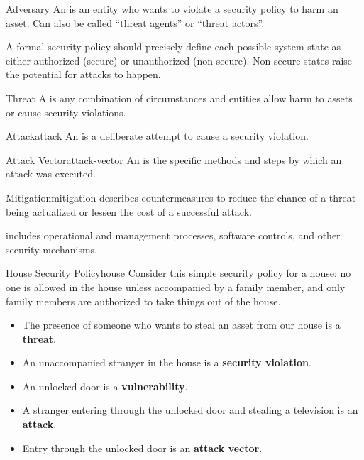 \documentclass[12pt]{report}
\begin{document}
\begin{dfnbox}{Adversary}{}
    An  is an entity who wants to violate a security policy to harm an asset.
    \tcblower
    Can also be called ``threat agents'' or ``threat actors''.
\end{dfnbox}

A formal security policy should precisely define each possible system state as either authorized (secure) or unauthorized (non-secure). Non-secure states raise the potential for attacks to happen.

\begin{dfnbox}{Threat}{}
    A  is any combination of circumstances and entities allow harm to assets or cause security violations.
\end{dfnbox}

\begin{dfnbox}{Attack}{attack}
    An  is a deliberate attempt to cause a security violation.
\end{dfnbox}

\begin{dfnbox}{Attack Vector}{attack-vector}
    An  is the specific methods and steps by which an attack was executed.
\end{dfnbox}

\begin{dfnbox}{Mitigation}{mitigation}
     describes countermeasures to reduce the chance of a threat being actualized or lessen the cost of a successful attack.
\end{dfnbox}

 includes operational and management processes, software controls, and other security mechanisms.

\begin{exbox}{House Security Policy}{house}
    Consider this simple security policy for a house: no one is allowed in the house unless accompanied by a family member, and only family members are authorized to take things out of the house.
    \begin{itemize}
        \item The presence of someone who wants to steal an asset from our house is a \textbf{threat}.
        \item An unaccompanied stranger in the house is a \textbf{security violation}.
        \item An unlocked door is a \textbf{vulnerability}.
        \item A stranger entering through the unlocked door and stealing a television is an \textbf{attack}.
        \item Entry through the unlocked door is an \textbf{attack vector}.
    \end{itemize}
\end{exbox}
\end{document}

